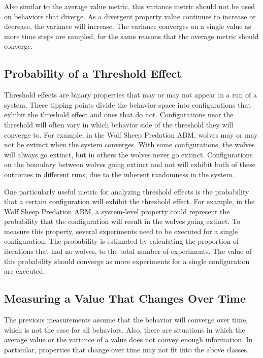 Also similar to the average value metric, this variance metric should not be used on behaviors that diverge.
As a divergent property value continues to increase or decrease, the variance will increase.
The variance converges on a single value as more time steps are sampled, for the same reasons that the average metric should converge.


\subsection{Probability of a Threshold Effect}
Threshold effects are binary properties that may or may not appear in a run of a system.
These tipping points divide the behavior space into configurations that exhibit the threshold effect and ones that do not.
Configurations near the threshold will often vary in which behavior side of the threshold they will converge to.
For example, in the Wolf Sheep Predation ABM, wolves may or may not be extinct when the system converges.
With some configurations, the wolves will always go extinct, but in others the wolves never go extinct.
Configurations on the boundary between wolves going extinct and not will exhibit both of these outcomes in different runs, due to the inherent randomness in the system.

One particularly useful metric for analyzing threshold effects is the probability that a certain configuration will exhibit the threshold effect.
For example, in the Wolf Sheep Predation ABM, a system-level property could represent the probability that the configuration will result in the wolves going extinct.
To measure this property, several experiments need to be executed for a single configuration. 
The probability is estimated by calculating the proportion of iterations that had no wolves, to the total number of experiments.
The value of this probability should converge as more experiments for a single configuration are executed.




\subsection{Measuring a Value That Changes Over Time}
The previous measurements assume that the behavior will converge over time, which is not the case for all behaviors.
Also, there are situations in which the average value or the variance of a value does not convey enough information.
In particular, properties that change over time may not fit into the above classes.

